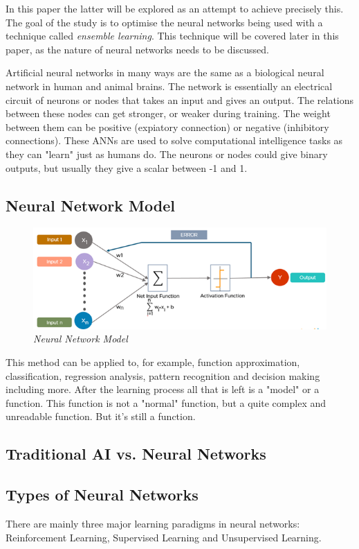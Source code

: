 \documentclass[
a4paper,
11pt,
english
]{report}
\begin{document}
In this paper the latter will be explored as an attempt to achieve precisely this. The goal of the study is to optimise the neural networks being used with a technique called \textit{ensemble learning}. This technique will be covered later in this paper, as the nature of neural networks needs to be discussed.

Artificial neural networks in many ways are the same as a biological neural network in human and animal brains. The network is essentially an electrical circuit of neurons or nodes that takes an input and gives an output. The relations between these nodes can get stronger, or weaker during training. The weight between them can be positive (expiatory connection) or negative (inhibitory connections). These ANNs are used to solve computational intelligence tasks as they can "learn" just as humans do. The neurons or nodes could give binary outputs, but usually they give a scalar between -1 and 1.

\subsection{Neural Network Model}
\begin{figure}[h]
    \centering
    \includegraphics[width=.7\textwidth]{nn_model}
    \caption{\textit{Neural Network Model}}
    \label{fig:nn_model}
\end{figure}

This method can be applied to, for example, function approximation, classification, regression analysis, pattern recognition and decision making including more. After the learning process all that is left is a "model" or a function. This function is not a "normal" function, but a quite complex and unreadable function. But it's still a function.

\subsection{Traditional AI vs. Neural Networks}


\subsection{Types of Neural Networks}
There are mainly three major learning paradigms in neural networks: Reinforcement Learning, Supervised Learning and Unsupervised Learning.
\end{document}
